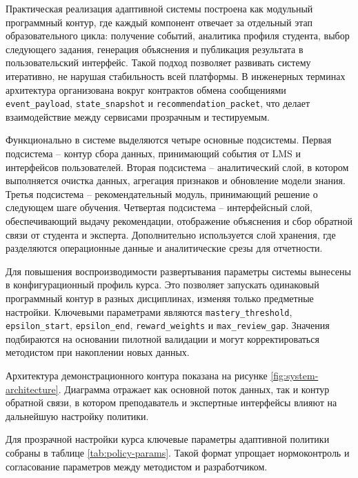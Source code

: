 Практическая реализация адаптивной системы построена как модульный программный
контур, где каждый компонент отвечает за отдельный этап образовательного цикла:
получение событий, аналитика профиля студента, выбор следующего задания,
генерация объяснения и публикация результата в пользовательский интерфейс.
Такой подход позволяет развивать систему итеративно, не нарушая стабильность
всей платформы. В инженерных терминах архитектура организована вокруг
контрактов обмена сообщениями \texttt{event\_payload}, \texttt{state\_snapshot}
и \texttt{recommendation\_packet}, что делает взаимодействие между сервисами
прозрачным и тестируемым.

Функционально в системе выделяются четыре основные подсистемы. Первая
подсистема -- контур сбора данных, принимающий события от LMS и интерфейсов
пользователей. Вторая подсистема -- аналитический слой, в котором выполняется
очистка данных, агрегация признаков и обновление модели знания. Третья
подсистема -- рекомендательный модуль, принимающий решение о следующем шаге
обучения. Четвертая подсистема -- интерфейсный слой, обеспечивающий выдачу
рекомендации, отображение объяснения и сбор обратной связи от студента и
эксперта. Дополнительно используется слой хранения, где разделяются
операционные данные и аналитические срезы для отчетности.

Для повышения воспроизводимости развертывания параметры системы вынесены в
конфигурационный профиль курса. Это позволяет запускать одинаковый программный
контур в разных дисциплинах, изменяя только предметные настройки. Ключевыми
параметрами являются \texttt{mastery\_threshold}, \texttt{epsilon\_start},
\texttt{epsilon\_end}, \texttt{reward\_weights} и \texttt{max\_review\_gap}.
Значения подбираются на основании пилотной валидации и могут корректироваться
методистом при накоплении новых данных.

Архитектура демонстрационного контура показана на рисунке
\ref{fig:system-architecture}. Диаграмма отражает как основной поток данных,
так и контур обратной связи, в котором преподаватель и экспертные интерфейсы
влияют на дальнейшую настройку политики.

Для прозрачной настройки курса ключевые параметры адаптивной политики собраны в
таблице \ref{tab:policy-params}. Такой формат упрощает нормоконтроль и
согласование параметров между методистом и разработчиком.

